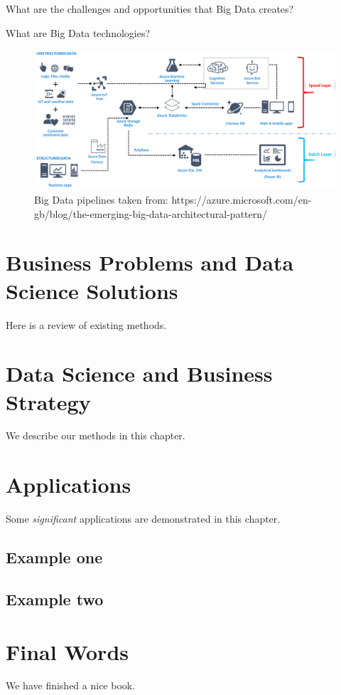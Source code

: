 \documentclass[
]{book}
\begin{document}
What are the challenges and opportunities that Big Data creates?

What are Big Data technologies?

\begin{figure}

{\centering \includegraphics[width=0.8\linewidth]{images/azure} 

}

\caption{Big Data pipelines taken from: https://azure.microsoft.com/en-gb/blog/the-emerging-big-data-architectural-pattern/}\label{fig:azure-fig}
\end{figure}

\hypertarget{businessproblems}{%
\chapter{Business Problems and Data Science Solutions}\label{businessproblems}}

Here is a review of existing methods.

\hypertarget{businessstrategy}{%
\chapter{Data Science and Business Strategy}\label{businessstrategy}}

We describe our methods in this chapter.

\hypertarget{applications}{%
\chapter{Applications}\label{applications}}

Some \emph{significant} applications are demonstrated in this chapter.

\hypertarget{example-one}{%
\section{Example one}\label{example-one}}

\hypertarget{example-two}{%
\section{Example two}\label{example-two}}

\hypertarget{final-words}{%
\chapter{Final Words}\label{final-words}}

We have finished a nice book.

  
\end{document}
